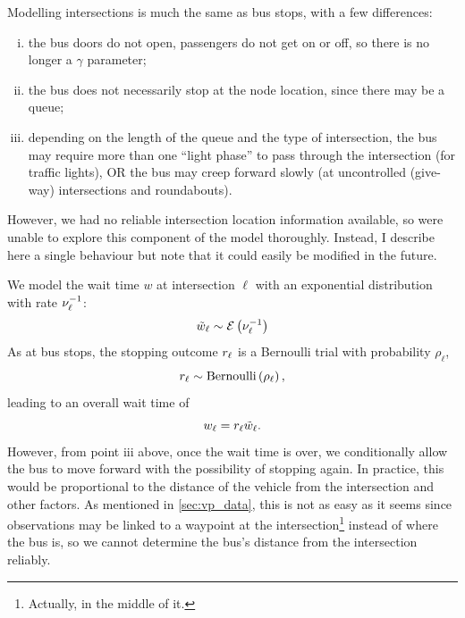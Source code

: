 Modelling intersections is much the same as bus stops, with a few differences:
\begin{enumerate}[i.]
\item the bus doors do not open, passengers do not get on or off, so there is no longer a $\gamma$ parameter;
\item the bus does not necessarily stop at the node location, since there may be a queue;
\item depending on the length of the queue and the type of intersection, the bus may require more than one ``light phase'' to pass through the intersection (for traffic lights), OR the bus may creep forward slowly (at uncontrolled (give-way) intersections and roundabouts).
\end{enumerate}
However, we had no reliable intersection location information available, so were unable to explore this component of the model thoroughly. Instead, I describe here a single behaviour but note that it could easily be modified in the future.

We model the wait time $w$ at intersection $\ell$ with an exponential distribution with rate $\nu_\ell^{-1}$:
\begin{equation}
\label{eq:int_wait}
\tilde w_\ell \sim \mathcal{E}\left(\nu_\ell^{-1}\right)
\end{equation}
As at bus stops, the stopping outcome $r_\ell$ is a Bernoulli trial with probability $\rho_\ell$,
\begin{equation}
\label{eq:int_stop_bern}
r_\ell \sim \mathrm{Bernoulli}\left(\rho_\ell\right),
\end{equation}
leading to an overall wait time of
\begin{equation}
\label{eq:int_total_wait}
w_\ell = r_\ell \tilde w_\ell.
\end{equation}
However, from point iii above, once the wait time is over, we conditionally allow the bus to move forward with the possibility of stopping again. In practice, this would be proportional to the distance of the vehicle from the intersection and other factors. As mentioned in \cref{sec:vp_data}, this is not as easy as it seems since observations may be linked to a waypoint at the intersection\footnote{Actually, in the middle of it.} instead of where the bus is, so we cannot determine the bus's distance from the intersection reliably.
